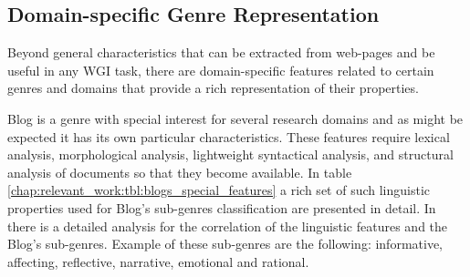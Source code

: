 \subsection{Domain-specific Genre Representation}

Beyond general characteristics that can be extracted from web-pages and be useful in any WGI task, there are domain-specific features related to certain genres and domains that provide a rich representation of their properties.

Blog is a genre with special interest for several research domains and as might be expected it has its own particular characteristics. These features require lexical analysis, morphological analysis, lightweight syntactical analysis, and structural analysis of documents so that they become available. In table \ref{chap:relevant_work:tbl:blogs_special_features} a rich set of such linguistic properties used for Blog's sub-genres classification are presented in detail. In \parencite{virik2017blog} there is a detailed analysis for the correlation of the linguistic features and the Blog's sub-genres. Example of these sub-genres are the following: informative, affecting, reflective, narrative, emotional and rational.


